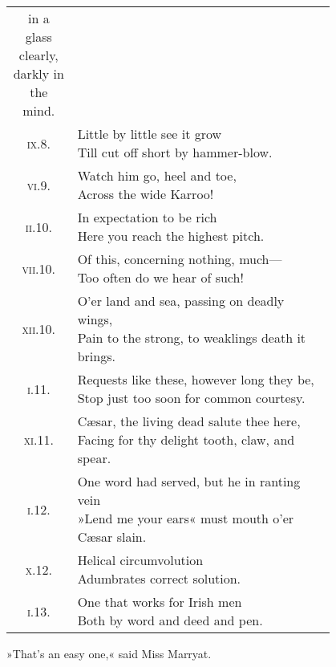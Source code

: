 \begin{longtable} {c p{0.8\linewidth}}
{in a glass clearly, darkly in the mind.}\\
\textsc{ix}.8. &  \makecell[l]{Little by little see it grow\\
Till cut off short by hammer-blow.}\\
\textsc{vi}.9. &  \makecell[l]{Watch him go, heel and toe,\\
Across the wide Karroo!}\\
\textsc{ii}.10. &  \makecell[l]{In expectation to be rich\\
Here you reach the highest pitch.}\\
\textsc{vii}.10. &  \makecell[l]{Of this, concerning nothing, much—\\
Too often do we hear of such!}\\
\textsc{xii}.10. &  \makecell[l]{O'er land and sea, passing on deadly wings,\\
Pain to the strong, to weaklings death it brings.}\\
\textsc{i}.11. &  \makecell[l]{Requests like these, however long they be,\\
Stop just too soon for common courtesy.}\\
\textsc{xi}.11. &  \makecell[l]{Cæsar, the living dead salute thee here,\\
Facing for thy delight tooth, claw, and spear.}\\
\textsc{i}.12. &  \makecell[l]{One word had served, but he in ranting vein\\
»Lend me your ears« must mouth o'er Cæsar slain.}\\
\textsc{x}.12. &  \makecell[l]{Helical circumvolution\\
Adumbrates correct solution.}\\
\textsc{i}.13. &  \makecell[l]{One that works for Irish men\\
Both by word and deed and pen.}\\
\end{longtable}

»That's an easy one,« said Miss Marryat.

